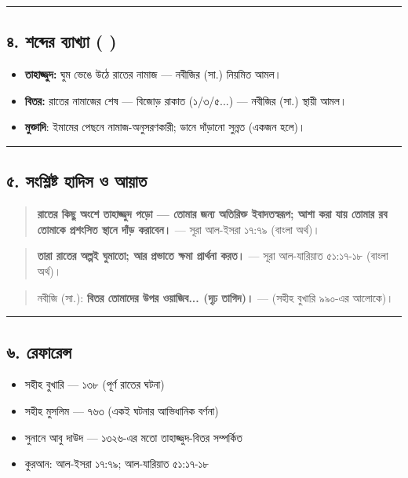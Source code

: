 \medskip\hrule\medskip

\subsection*{৪. শব্দের ব্যাখ্যা ( )}

\begin{itemize}
\item \textbf{তাহাজ্জুদ:} ঘুম ভেঙে উঠে রাতের নামাজ — নবীজির (সা.) নিয়মিত আমল।
\item \textbf{বিতর:} রাতের নামাজের শেষ — বিজোড় রাকাত (১/৩/৫...) — নবীজির (সা.) স্থায়ী আমল।
\item \textbf{মুক্তাদি}: ইমামের পেছনে নামাজ-অনুসরণকারী; ডানে দাঁড়ানো সুন্নত (একজন হলে)।
\end{itemize}
\medskip\hrule\medskip

\subsection*{৫. সংশ্লিষ্ট হাদিস ও আয়াত}

\begin{quote}
\textbf{রাতের কিছু অংশে তাহাজ্জুদ পড়ো — তোমার জন্য অতিরিক্ত ইবাদতস্বরূপ; আশা করা যায় তোমার রব তোমাকে প্রশংসিত স্থানে দাঁড় করাবেন।} — সূরা আল-ইসরা ১৭:৭৯ (বাংলা অর্থ)।
\end{quote}

\begin{quote}
\textbf{তারা রাতের অল্পই ঘুমাতো; আর প্রভাতে ক্ষমা প্রার্থনা করত।} — সূরা আল-যারিয়াত ৫১:১৭-১৮ (বাংলা অর্থ)।
\end{quote}

\begin{quote}
নবীজি (সা.): \textbf{বিতর তোমাদের উপর ওয়াজিব... (দৃঢ় তাগিদ)।} — (সহীহ বুখারি ৯৯০-এর আলোকে)।
\end{quote}

\medskip\hrule\medskip

\subsection*{৬. রেফারেন্স}

\begin{itemize}
\item সহীহ বুখারি — ১৩৮ (পূর্ণ রাতের ঘটনা)
\item সহীহ মুসলিম — ৭৬৩ (একই ঘটনার আভিধানিক বর্ণনা)
\item সুনানে আবু দাউদ — ১৩২৬-এর মতো তাহাজ্জুদ-বিতর সম্পর্কিত
\item কুরআন: আল-ইসরা ১৭:৭৯; আল-যারিয়াত ৫১:১৭-১৮
\end{itemize}


